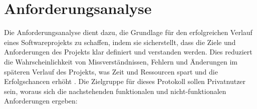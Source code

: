 \chapter{Anforderungsanalyse}
\label{chap:anforderungsanalyse}



Die Anforderungsanalyse dient dazu, die Grundlage für den erfolgreichen Verlauf eines Softwareprojekts zu schaffen, indem sie sicherstellt, dass die Ziele und Anforderungen des Projekts klar definiert und verstanden werden. Dies reduziert die Wahrscheinlichkeit von Missverständnissen, Fehlern und Änderungen im späteren Verlauf des Projekts, was Zeit und Ressourcen spart und die Erfolgschancen erhöht \parencite{Zakharyan_SoftwareRequirementsForMessagingService}. Die Zielgruppe für dieses Protokoll sollen Privatnutzer sein, woraus sich die nachstehenden funktionalen und nicht-funktionalen Anforderungen ergeben:




